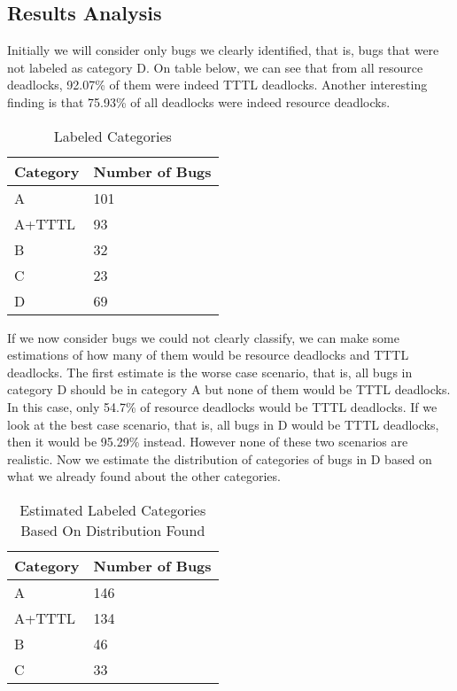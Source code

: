 \subsection{Results Analysis}

Initially we will consider only bugs we clearly identified, that is, bugs that were not labeled as category D.
On table below, we can see that from all resource deadlocks, 92.07\% of them were indeed TTTL deadlocks.
Another interesting finding is that 75.93\% of all deadlocks were indeed resource deadlocks.

\begin{table}
\begin{center}
\caption{Labeled Categories}
\begin{tabular}{|l|l|}
\hline
Category & Number of Bugs \\
\hline
A & 101 \\
A+TTTL & 93 \\
B & 32 \\
C & 23 \\
D & 69 \\
\hline
\end{tabular}
\end{center}
\end{table}

If we now consider bugs we could not clearly classify, we can make some estimations of how many of them would be resource deadlocks and TTTL deadlocks.
The first estimate is the worse case scenario, that is, all bugs in category D should be in category A but none of them would be TTTL deadlocks. In this case, only 54.7\% of resource deadlocks would be TTTL deadlocks. If we look at the best case scenario, that is, all bugs in D would be TTTL deadlocks, then it would be 95.29\% instead. However none of these two scenarios are realistic. Now we estimate the distribution of categories of bugs in D based on what we already found about the other categories.

\begin{table}
\begin{center}
\caption{Estimated Labeled Categories Based On Distribution Found}
\begin{tabular}{|l|l|}
\hline
Category & Number of Bugs \\
\hline
A & 146 \\  
A+TTTL &  134 \\
B & 46 \\
C & 33 \\
\hline
\end{tabular}
\end{center}
\end{table}

